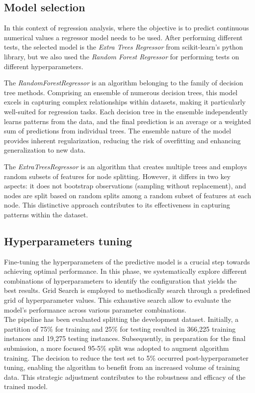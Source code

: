 \documentclass[conference]{IEEEtran}
\begin{document}
\subsection{Model selection}
In this context of regression analysis, where the objective is to predict continuous numerical values 
a regressor model needs to be used. After performing different tests, the selected model is the 
\textit{Extra Trees Regressor} from scikit-learn's python library, but we also used the 
\textit{Random Forest Regressor} for performing tests on different hyperparameters.

The \textit{RandomForestRegressor} is an algorithm belonging to the family of decision tree methods. 
Comprising an ensemble of numerous decision trees, this model excels in capturing complex 
relationships within datasets, making it particularly well-suited for regression tasks. 
Each decision tree in the ensemble independently learns patterns from the data, and the 
final prediction is an average or a weighted sum of predictions 
from individual trees. \cite{OpenAI_ChatGPT_help_me_on_this}
The ensemble nature of the model provides inherent regularization, reducing the risk of
overfitting and enhancing generalization to new data.

The \textit{ExtraTreesRegressor} is an algorithm that creates multiple trees and 
employs random subsets of features for node splitting. However, it differs in 
two key aspects: it does not bootstrap observations 
(sampling without replacement), and nodes are split based on random splits among a random subset
of features at each node. This distinctive approach contributes to its effectiveness in 
capturing patterns within the dataset. \cite{stackexchange_438384}


\subsection{Hyperparameters tuning}
Fine-tuning the hyperparameters of the predictive model is a crucial step towards 
achieving optimal performance. In this phase, we systematically explore different 
combinations of hyperparameters to identify the configuration that yields the best 
results. 
Grid Search is employed to methodically search through a predefined grid of 
hyperparameter values. This exhaustive search allow to evaluate the model's performance 
across various parameter combinations.\\

The pipeline has been evaluated splitting the development dataset. 
Initially, a partition of 75\% for training and 25\% for testing resulted in 366,225 training 
instances and 19,275 testing instances. Subsequently, in preparation for the final submission, 
a more focused 95-5\% split was adopted to augment algorithm training. 
The decision to reduce the test set to 5\% occurred post-hyperparameter tuning, enabling the 
algorithm to benefit from an increased volume of training data. This strategic adjustment 
contributes to the robustness and efficacy of the trained model.
\end{document}
